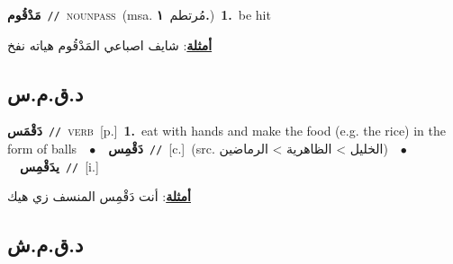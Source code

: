 \documentclass[10pt,a4paper,twoside]{article} %
\begin{document}
\begin{multicols}{2}
{\setlength\topsep{0pt}\textbf{\foreignlanguage{arabic}{مَدْقُوم}}\ {\color{gray}\texttt{//}\color{black}}\ \textsc{noun\textunderscore pass}\ \color{gray}(msa. \foreignlanguage{arabic}{مُرتطم}~\foreignlanguage{arabic}{\textbf{١.}})\color{black}\ \textbf{1.}~be hit\  \begin{flushright}\color{gray}\foreignlanguage{arabic}{\textbf{\underline{\foreignlanguage{arabic}{أمثلة}}}: شايف اصباعي المَدْقُوم هياته نفخ}\end{flushright}\color{black}} \vspace{2mm}

\vspace{-3mm}
\subsection*{\color{blue}\foreignlanguage{arabic}{د.ق.م.س}\color{blue}{}} 

{\setlength\topsep{0pt}\textbf{\foreignlanguage{arabic}{دَقْمَس}}\ {\color{gray}\texttt{//}\color{black}}\ \textsc{verb}\ [p.]\ \textbf{1.}~eat with hands and make the food (e.g. the rice) in the form of balls\ \ $\bullet$\ \ \setlength\topsep{0pt}\textbf{\foreignlanguage{arabic}{دَقْمِس}}\ {\color{gray}\texttt{//}\color{black}}\ [c.]\ (src. \color{gray}\foreignlanguage{arabic}{الخليل > الظاهرية > الرماضين}\color{black})\ \ $\bullet$\ \ \setlength\topsep{0pt}\textbf{\foreignlanguage{arabic}{يدَقْمِس}}\ {\color{gray}\texttt{//}\color{black}}\ [i.]\  \begin{flushright}\color{gray}\foreignlanguage{arabic}{\textbf{\underline{\foreignlanguage{arabic}{أمثلة}}}: أنت دَقْمِس المنسف زي هيك}\end{flushright}\color{black}} \vspace{2mm}

\vspace{-3mm}
\subsection*{\color{blue}\foreignlanguage{arabic}{د.ق.م.ش}\color{blue}{}} 


\end{multicols}
\end{document}
